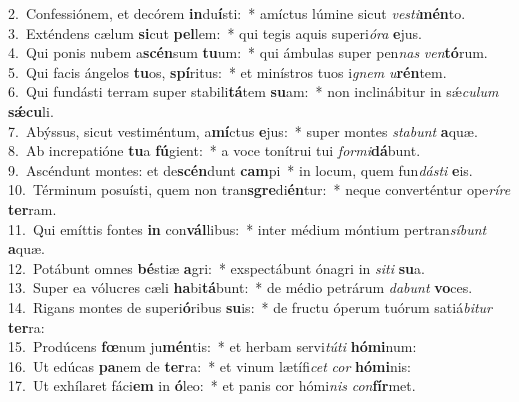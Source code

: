 {2.~}Confessiónem, et decórem \textbf{in}du\textbf{í}sti:~* amíctus lúmine sicut \textit{ve}\textit{sti}\textbf{mén}to.\\
{3.~}Exténdens cælum \textbf{si}cut \textbf{pel}lem:~* qui tegis aquis superi\textit{ó}\textit{ra} \textbf{e}jus.\\
{4.~}Qui ponis nubem a\textbf{scén}sum \textbf{tu}um:~* qui ámbulas super pen\textit{nas} \textit{ven}\textbf{tó}rum.\\
{5.~}Qui facis ángelos \textbf{tu}os, \textbf{spí}ritus:~* et minístros tuos i\textit{gnem} \textit{u}\textbf{rén}tem.\\
{6.~}Qui fundásti terram super stabili\textbf{tá}tem \textbf{su}am:~* non inclinábitur in sǽ\textit{cu}\textit{lum} \textbf{sǽ}\textbf{cu}li.\\
{7.~}Abýssus, sicut vestiméntum, a\textbf{mí}ctus \textbf{e}jus:~* super montes \textit{sta}\textit{bunt} \textbf{a}quæ.\\
{8.~}Ab increpatióne \textbf{tu}a \textbf{fú}gient:~* a voce tonítrui tui \textit{for}\textit{mi}\textbf{dá}bunt.\\
{9.~}Ascéndunt montes: et de\textbf{scén}dunt \textbf{cam}pi~* in locum, quem fun\textit{dá}\textit{sti} \textbf{e}is.\\
{10.~}Términum posuísti, quem non tran\textbf{sgre}di\textbf{én}tur:~* neque converténtur ope\textit{rí}\textit{re} \textbf{ter}ram.\\
{11.~}Qui emíttis fontes \textbf{in} con\textbf{vál}libus:~* inter médium móntium pertran\textit{sí}\textit{bunt} \textbf{a}quæ.\\
{12.~}Potábunt omnes \textbf{bé}stiæ \textbf{a}gri:~* exspectábunt ónagri in \textit{si}\textit{ti} \textbf{su}a.\\
{13.~}Super ea vólucres cæli \textbf{ha}bi\textbf{tá}bunt:~* de médio petrárum \textit{da}\textit{bunt} \textbf{vo}ces.\\
{14.~}Rigans montes de superi\textbf{ó}ribus \textbf{su}is:~* de fructu óperum tuórum satiá\textit{bi}\textit{tur} \textbf{ter}ra:\\
{15.~}Prodúcens \textbf{fœ}num ju\textbf{mén}tis:~* et herbam servi\textit{tú}\textit{ti} \textbf{hó}\textbf{mi}num:\\
{16.~}Ut edúcas \textbf{pa}nem de \textbf{ter}ra:~* et vinum lætífi\textit{cet} \textit{cor} \textbf{hó}\textbf{mi}nis:\\
{17.~}Ut exhílaret fáci\textbf{em} in \textbf{ó}leo:~* et panis cor hómi\textit{nis} \textit{con}\textbf{fír}met.\\
